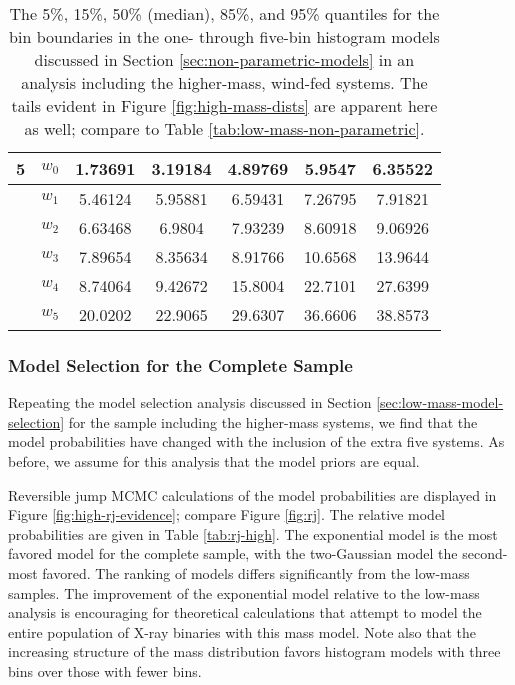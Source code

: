 \documentclass[preprint]{aastex}
\begin{document}
\begin{table}
\begin{center}
\begin{tabular}{|c|c|c|c|c|c|c|}
      \hline \hline
      5 & $w_0$ & 1.73691 & 3.19184 & 4.89769 & 5.9547 & 6.35522 \\
      \hline
      & $w_1$ & 5.46124 & 5.95881 & 6.59431 & 7.26795 & 7.91821 \\
      \hline
      & $w_2$ & 6.63468 & 6.9804 & 7.93239 & 8.60918 & 9.06926 \\
      \hline
      & $w_3$ & 7.89654 & 8.35634 & 8.91766 & 10.6568 & 13.9644 \\
      \hline
      & $w_4$ & 8.74064 & 9.42672 & 15.8004 & 22.7101 & 27.6399 \\
      \hline
      & $w_5$ & 20.0202 & 22.9065 & 29.6307 & 36.6606 & 38.8573 \\
      \hline
    \end{tabular}
  \end{center}
  \caption{\label{tab:high-mass-non-parametric} The 5\%, 15\%, 50\%
    (median), 85\%, and 95\% quantiles for the bin boundaries in the
    one- through five-bin histogram models discussed in Section
    \ref{sec:non-parametric-models} in an 
    analysis including the higher-mass, wind-fed systems.  
    The tails evident in Figure \ref{fig:high-mass-dists} are apparent
    here as well; compare to Table \ref{tab:low-mass-non-parametric}.}
\end{table}

\subsubsection{Model Selection for the Complete Sample}
\label{sec:high-mass-model-selection}

Repeating the model selection analysis discussed in Section
\ref{sec:low-mass-model-selection} for the sample including the
higher-mass systems, we find that the model probabilities have changed
with the inclusion of the extra five systems.  As before, we assume
for this analysis that the model priors are equal.

Reversible jump MCMC calculations of the model probabilities are
displayed in Figure \ref{fig:high-rj-evidence}; compare Figure
\ref{fig:rj}.  The relative model probabilities are given in Table
\ref{tab:rj-high}.  The exponential model is the most favored model
for the complete sample, with the two-Gaussian model the second-most
favored.  The ranking of models differs significantly from the
low-mass samples.  The improvement of the exponential model relative
to the low-mass analysis is encouraging for theoretical calculations
that attempt to model the entire population of X-ray binaries with
this mass model.  Note also that the increasing structure of the mass
distribution favors histogram models with three bins over those with
fewer bins.
\end{document}

